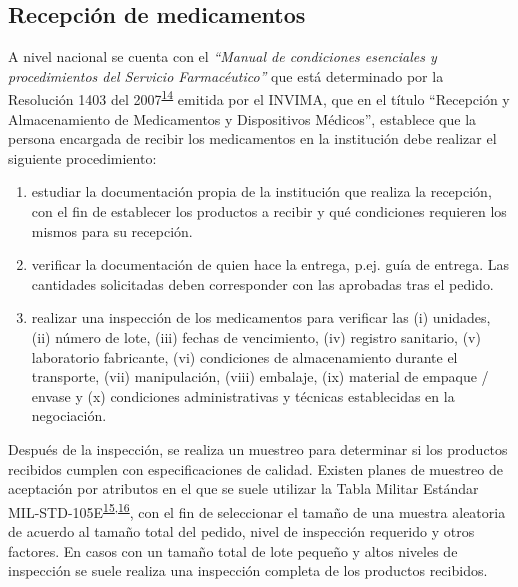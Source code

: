 \documentclass[
]{book}
\begin{document}

\hypertarget{recepciuxf3n-de-medicamentos}{%
\subsection{Recepción de medicamentos}\label{recepciuxf3n-de-medicamentos}}

A nivel nacional se cuenta con el \emph{``Manual de condiciones esenciales y procedimientos del Servicio Farmacéutico''} que está determinado por la Resolución 1403 del 2007\textsuperscript{\protect\hyperlink{ref-MinisteriodeSaludyProteccionSocial2007}{14}} emitida por el INVIMA, que en el título ``Recepción y Almacenamiento de Medicamentos y Dispositivos Médicos'', establece que la persona encargada de recibir los medicamentos en la institución debe realizar el siguiente procedimiento:

\begin{enumerate}
\def\labelenumi{\arabic{enumi}.}
\item
  estudiar la documentación propia de la institución que realiza la recepción, con el fin de establecer los productos a recibir y qué condiciones requieren los mismos para su recepción.
\item
  verificar la documentación de quien hace la entrega, p.ej. guía de entrega. Las cantidades solicitadas deben corresponder con las aprobadas tras el pedido.
\item
  realizar una inspección de los medicamentos para verificar las (i) unidades, (ii) número de lote, (iii) fechas de vencimiento, (iv) registro sanitario, (v) laboratorio fabricante, (vi) condiciones de almacenamiento durante el transporte, (vii) manipulación, (viii) embalaje, (ix) material de empaque / envase y (x) condiciones administrativas y técnicas establecidas en la negociación.
\end{enumerate}

Después de la inspección, se realiza un muestreo para determinar si los productos recibidos cumplen con especificaciones de calidad. Existen planes de muestreo de aceptación por atributos en el que se suele utilizar la Tabla Militar Estándar MIL-STD-105E\textsuperscript{\protect\hyperlink{ref-AmericanNationalStandardsInstitute2013}{15},\protect\hyperlink{ref-GutierrezPulido2008}{16}}, con el fin de seleccionar el tamaño de una muestra aleatoria de acuerdo al tamaño total del pedido, nivel de inspección requerido y otros factores. En casos con un tamaño total de lote pequeño y altos niveles de inspección se suele realiza una inspección completa de los productos recibidos.
\end{document}
